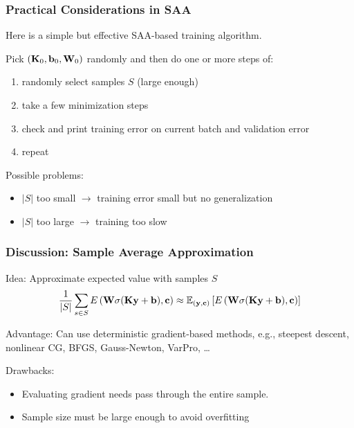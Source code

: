\documentclass[12pt,fleqn,handout]{beamer}
\begin{document}
\begin{frame}
	\frametitle{Practical Considerations in SAA}
	
	Here is a simple but effective SAA-based training algorithm.
	
	\bigskip
	\pause
	
	Pick $({\bf K}_0,{\bf b}_0,{\bf W}_0)$ randomly and then do one or more steps of:
	\begin{enumerate}
		\item randomly select samples $S$ (large enough)
		\item take a few minimization steps
		\item check and print training error on current batch and validation error
		\item repeat
	\end{enumerate}
	
	\bigskip
	\pause
	
	Possible problems:
	\begin{itemize}
		\item $|S|$ too small $\rightarrow$ training error small but no generalization
		\item $|S|$ too large $\rightarrow$ training too slow
	\end{itemize}	
\end{frame}
\begin{frame}\frametitle{Discussion: Sample Average Approximation}

Idea: Approximate expected value with samples $S$
$$
	\frac{1}{|S|} \sum_{s\in S} E\left({\bf W} \sigma({\bf K}{\bf y}+{\bf b}),{\bf c}\right) \approx  {\mathbb{E}}_{({\bf y},{\bf c})}\left[E\left({\bf W} \sigma({\bf K}{\bf y}+{\bf b}),{\bf c}\right)\right]
	$$
	
Advantage: Can use deterministic gradient-based methods, e.g., steepest descent, nonlinear CG, BFGS, Gauss-Newton, VarPro, \ldots

\bigskip
\pause

Drawbacks:
\begin{itemize}
\item
Evaluating gradient needs pass through the entire sample.
\item Sample size must be large enough to avoid overfitting
\end{itemize} 



\end{frame}
\end{document}
